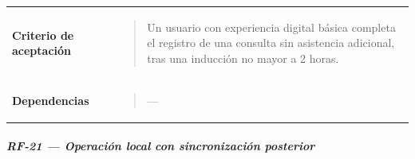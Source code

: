 \documentclass[
]{article}
\begin{document}
{\begin{longtable}[]{@{}
  >{\raggedright\arraybackslash}p{}
  >{\raggedright\arraybackslash}p{}@{}}
\textbf{Criterio de aceptación} &
\begin{minipage}[t]{\linewidth}\raggedright
\begin{quote}
Un usuario con experiencia digital básica completa el registro de una
consulta sin asistencia adicional, tras una inducción no mayor a 2
horas.
\end{quote}
\end{minipage} \\
\textbf{Dependencias} & \begin{minipage}[t]{\linewidth}\raggedright
\begin{quote}
---
\end{quote}
\end{minipage} \\
\end{longtable}
}

\subparagraph{RF-21 --- Operación local con sincronización
posterior}\label{rf-21-operaciuxf3n-local-con-sincronizaciuxf3n-posterior}
\end{document}
